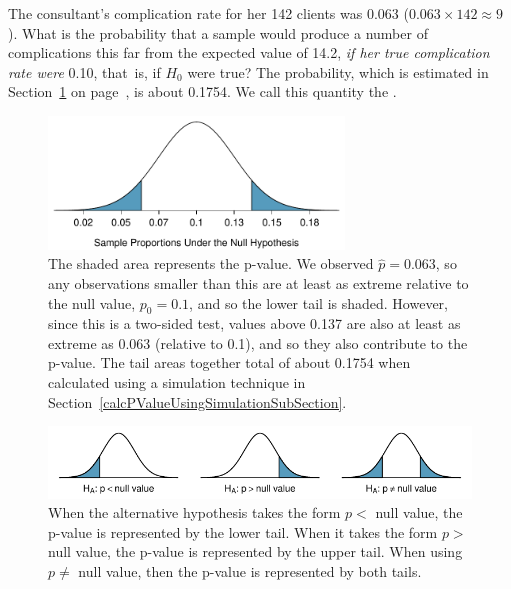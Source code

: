 The consultant's complication rate for her 142 clients was 0.063 ($0.063 \times 142 \approx 9$). What is the probability that a sample would produce a number of complications this far from the expected value of 14.2, \emph{if her true complication rate were} 0.10, that~is, if $H_0$ were true? The probability, which is estimated in Section~\ref{MedConsNullNormal} on page~\pageref{MedConsNullNormal}, is about 0.1754. We call this quantity the .

\begin{figure}[ht]
\centering
\includegraphics[width=0.7\textwidth]{ch_foundations_for_inf/figures/MedicalConsultant/MedConsNullNormal}
\caption{The shaded area represents the p-value. We observed $\hat{p} = 0.063$, so any observations smaller than this are at least as extreme relative to the null value, $p_0 = 0.1$, and so the lower tail is shaded. However, since this is a two-sided test, values above 0.137 are also at least as extreme as 0.063 (relative to 0.1), and so they also contribute to the p-value. The tail areas together total of about 0.1754 when calculated using a simulation technique in Section~\ref{calcPValueUsingSimulationSubSection}.}
\label{MedConsNullNormal}
\end{figure}

\begin{figure}[ht]
\centering
\includegraphics[width=\textwidth]{ch_foundations_for_inf/figures/sidedness/sidedness_example_figures}
\caption{When the alternative hypothesis takes the form $p <$ null value, the p-value is represented by the lower tail. When it takes the form $p >$ null value, the p-value is represented by the upper tail. When using $p \neq$ null value, then the p-value is represented by both tails.}
\label{sidedness_example_figures}
\end{figure}



